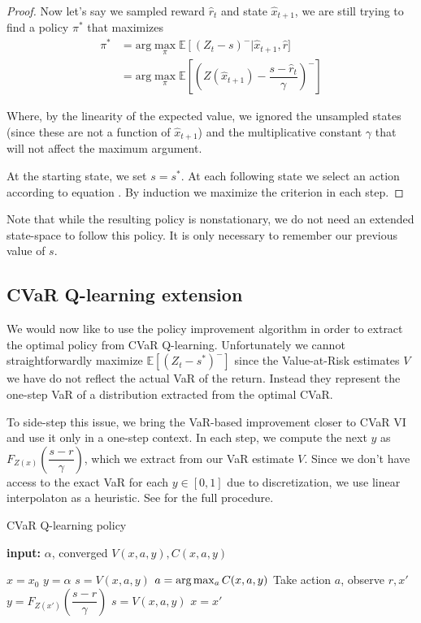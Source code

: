 \begin{proof}
Now let's say we sampled reward $\hat{r}_t$ and state $\hat{x}_{t+1}$, we are still trying to find a policy $\pi^*$ that maximizes 
\begin{equation}\label{eqn:sampled x_t+1}
\begin{split}
\pi^* &=\text{arg}\max_\pi \mathbb{E}\left[(Z_t-s)^-\right | \hat{x}_{t+1}, \hat{r}]\\
&= \text{arg}\max_\pi \mathbb{E}\left[\left(Z(\hat{x}_{t+1}) - \dfrac{s - \hat{r}_t}{\gamma}\right)^-\right]
\end{split}
\end{equation}

Where, by the linearity of the expected value, we ignored the unsampled states (since these are not a function of $\hat{x}_{t+1}$) and the multiplicative constant $\gamma$ that will not affect the maximum argument.

At the starting state, we set $s=s^*$. At each following state we select an action according to equation . By induction we maximize the criterion  in each step.
\end{proof}

Note that while the resulting policy is nonstationary, we do not need an extended state-space to follow this policy. It is only necessary to remember our previous value of $s$.

\subsection{CVaR Q-learning extension}
We would now like to use the policy improvement algorithm in order to extract the optimal policy from CVaR Q-learning. Unfortunately we cannot straightforwardly maximize $\mathbb{E}\left[(Z_t-s^*)^-\right]$ since the Value-at-Risk estimates $V$ we have do not reflect the actual VaR of the return. Instead they represent the one-step VaR of a distribution extracted from the optimal CVaR.

To side-step this issue, we bring the VaR-based improvement closer to CVaR VI and use it only in a one-step context. In each step, we compute the next $y$ as $F_{Z(x)}(\dfrac{s-r}{\gamma})$, which we extract from our VaR estimate $V$. Since we don't have access to the exact VaR for each $y \in [0,1]$ due to discretization, we use linear interpolaton as a heuristic. See  for the full procedure.
\begin{algorithm}
\caption{CVaR Q-learning policy}\label{alg:varxibasedpolicy}
\begin{algorithmic}
    \STATE \textbf{input:} $\alpha$, converged $V(x, a, y), C(x, a, y)$
    		
	\STATE $x = x_0$
	\STATE $y = \alpha$
	\STATE $s = V(x, a, y)$
	\STATE $a = \text{arg}\max_a C(x, a, y)$
	\STATE Take action $a$, observe $r, x'$
	\STATE $y = F_{Z(x')}(\dfrac{s-r}{\gamma})$
	\STATE $s = V(x, a, y)$
	\STATE $x = x'$
	\ENDWHILE
\end{algorithmic}
\end{algorithm}

